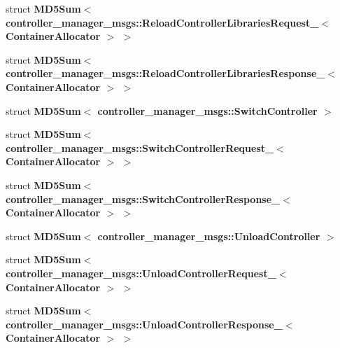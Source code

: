 \begin{DoxyCompactItemize}
\item 
struct {\bf \-M\-D5\-Sum$<$ controller\-\_\-manager\-\_\-msgs\-::\-Reload\-Controller\-Libraries\-Request\-\_\-$<$ Container\-Allocator $>$ $>$}
\item 
struct {\bf \-M\-D5\-Sum$<$ controller\-\_\-manager\-\_\-msgs\-::\-Reload\-Controller\-Libraries\-Response\-\_\-$<$ Container\-Allocator $>$ $>$}
\item 
struct {\bf \-M\-D5\-Sum$<$ controller\-\_\-manager\-\_\-msgs\-::\-Switch\-Controller $>$}
\item 
struct {\bf \-M\-D5\-Sum$<$ controller\-\_\-manager\-\_\-msgs\-::\-Switch\-Controller\-Request\-\_\-$<$ Container\-Allocator $>$ $>$}
\item 
struct {\bf \-M\-D5\-Sum$<$ controller\-\_\-manager\-\_\-msgs\-::\-Switch\-Controller\-Response\-\_\-$<$ Container\-Allocator $>$ $>$}
\item 
struct {\bf \-M\-D5\-Sum$<$ controller\-\_\-manager\-\_\-msgs\-::\-Unload\-Controller $>$}
\item 
struct {\bf \-M\-D5\-Sum$<$ controller\-\_\-manager\-\_\-msgs\-::\-Unload\-Controller\-Request\-\_\-$<$ Container\-Allocator $>$ $>$}
\item 
struct {\bf \-M\-D5\-Sum$<$ controller\-\_\-manager\-\_\-msgs\-::\-Unload\-Controller\-Response\-\_\-$<$ Container\-Allocator $>$ $>$}
\end{DoxyCompactItemize}
